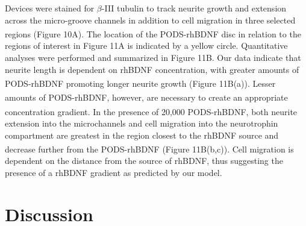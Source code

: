\documentclass[review]{elsarticle}
\begin{document}
Devices were stained for $\beta$-III tubulin to track neurite growth and extension across the micro-groove channels in addition to cell migration in three selected regions (Figure 10A). The location of the PODS\textsuperscript{\textregistered}-rhBDNF disc in relation to the regions of interest in Figure 11A is indicated by a yellow circle. Quantitative analyses were performed and summarized in Figure 11B. Our data indicate that neurite length is dependent on rhBDNF concentration, with greater amounts of PODS\textsuperscript{\textregistered}-rhBDNF promoting longer neurite growth (Figure 11B(a)). Lesser amounts of PODS\textsuperscript{\textregistered}-rhBDNF, however, are necessary to create an appropriate concentration gradient. In the presence of 20,000 PODS\textsuperscript{\textregistered}-rhBDNF, both neurite extension into the microchannels and cell migration into the neurotrophin compartment are greatest in the region closest to the rhBDNF source and decrease further from the PODS\textsuperscript{\textregistered}-rhBDNF (Figure 11B(b,c)). Cell migration is dependent on the distance from the source of rhBDNF, thus suggesting the presence of a rhBDNF gradient as predicted by our model.


\section {Discussion}%
\end{document}
